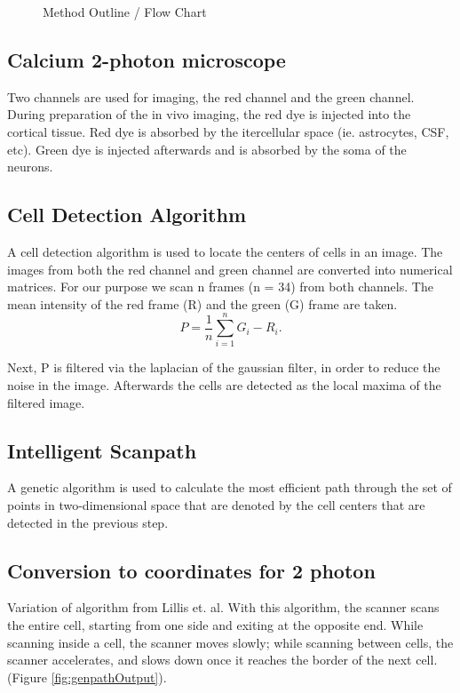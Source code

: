 \documentclass{article}
\begin{document}
\begin{figure}[htbp]

\caption{Method Outline / Flow Chart}
\label{fig:methodOutline}
\end{figure}


\subsection{Calcium 2-photon microscope}
Two channels are used for imaging, the red channel and the green channel.  During preparation of the in vivo imaging, 
the red dye is injected into the cortical tissue. Red dye is absorbed by the itercellular space (ie. astrocytes, CSF, etc).
Green dye is injected afterwards and is absorbed by the soma of the neurons.

\subsection{Cell Detection Algorithm}
A cell detection algorithm is used to locate the centers of cells in an image.  The images from both the red channel and green
channel are converted into numerical matrices.  For our purpose we scan n frames (n = 34) from both channels.  The mean intensity
of the red frame (R) and the green (G) frame are taken. 
\begin{equation}
P = \frac{1}{n}\sum_{i=1}^{n}G_i-R_i.
\end{equation}

Next, P is filtered via the laplacian of the gaussian filter, in order to reduce the noise in the image. Afterwards the cells
are detected as the local maxima of the filtered image.


\subsection{Intelligent Scanpath}
A genetic algorithm is used to calculate the most efficient path through the set of points in two-dimensional space that 
are denoted by the cell centers that are detected in the previous step.  

\subsection{Conversion to coordinates for 2 photon}


Variation of algorithm from Lillis et. al. \cite{lillis}  With this algorithm, the scanner scans the entire cell, starting from one side and exiting at the opposite end.  While scanning 
inside a cell, the scanner moves slowly; while scanning between cells, the scanner accelerates, and slows down once it reaches the border of the next cell. 
(Figure \ref{fig:genpathOutput}).
\end{document}
